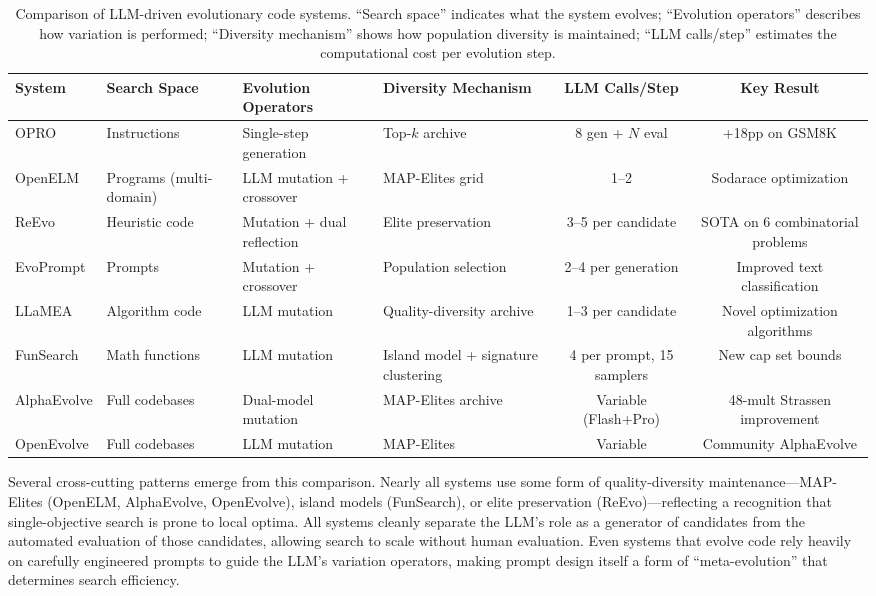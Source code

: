 \begin{table}[t]
\centering
\caption{Comparison of LLM-driven evolutionary code systems. ``Search space'' indicates what the system evolves; ``Evolution operators'' describes how variation is performed; ``Diversity mechanism'' shows how population diversity is maintained; ``LLM calls/step'' estimates the computational cost per evolution step.}
\label{tab:evo-comparison}
\small
\begin{tabular}{@{}llllcc@{}}
\toprule
\textbf{System} & \textbf{Search Space} & \textbf{Evolution Operators} & \textbf{Diversity Mechanism} & \textbf{LLM Calls/Step} & \textbf{Key Result} \\
\midrule
OPRO & Instructions & Single-step generation & Top-$k$ archive & 8 gen + $N$ eval & +18pp on GSM8K \\
OpenELM & Programs (multi-domain) & LLM mutation + crossover & MAP-Elites grid & 1--2 & Sodarace optimization \\
ReEvo & Heuristic code & Mutation + dual reflection & Elite preservation & 3--5 per candidate & SOTA on 6 combinatorial problems \\
EvoPrompt & Prompts & Mutation + crossover & Population selection & 2--4 per generation & Improved text classification \\
LLaMEA & Algorithm code & LLM mutation & Quality-diversity archive & 1--3 per candidate & Novel optimization algorithms \\
FunSearch & Math functions & LLM mutation & Island model + signature clustering & 4 per prompt, 15 samplers & New cap set bounds \\
AlphaEvolve & Full codebases & Dual-model mutation & MAP-Elites archive & Variable (Flash+Pro) & 48-mult Strassen improvement \\
OpenEvolve & Full codebases & LLM mutation & MAP-Elites & Variable & Community AlphaEvolve \\
\bottomrule
\end{tabular}
\end{table}

Several cross-cutting patterns emerge from this comparison. Nearly all systems use some form of quality-diversity maintenance---MAP-Elites (OpenELM, AlphaEvolve, OpenEvolve), island models (FunSearch), or elite preservation (ReEvo)---reflecting a recognition that single-objective search is prone to local optima. All systems cleanly separate the LLM's role as a generator of candidates from the automated evaluation of those candidates, allowing search to scale without human evaluation. Even systems that evolve code rely heavily on carefully engineered prompts to guide the LLM's variation operators, making prompt design itself a form of ``meta-evolution'' that determines search efficiency.


